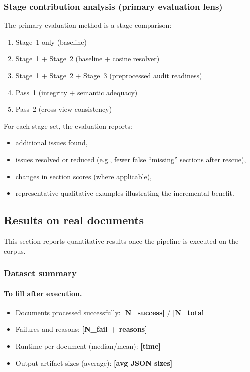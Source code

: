 \subsubsection{Stage contribution analysis (primary evaluation lens)}
\label{sec:eval_stage_contribution}

The primary evaluation method is a stage comparison:
\begin{enumerate}
    \item Stage~1 only (baseline)
    \item Stage~1 + Stage~2 (baseline + cosine resolver)
    \item Stage~1 + Stage~2 + Stage~3 (preprocessed audit readiness)
    \item Pass~1 (integrity + semantic adequacy)
    \item Pass~2 (cross-view consistency)
\end{enumerate}

For each stage set, the evaluation reports:
\begin{itemize}
    \item additional issues found,
    \item issues resolved or reduced (e.g., fewer false ``missing'' sections after rescue),
    \item changes in section scores (where applicable),
    \item representative qualitative examples illustrating the incremental benefit.
\end{itemize}

\subsection{Results on real documents}
\label{sec:eval_results}

This section reports quantitative results once the pipeline is executed on the corpus.

\subsubsection{Dataset summary}
\label{sec:eval_dataset_summary}

\paragraph{To fill after execution.}
\begin{itemize}
    \item Documents processed successfully: \textbf{[N\_success]} / \textbf{[N\_total]}
    \item Failures and reasons: \textbf{[N\_fail + reasons]}
    \item Runtime per document (median/mean): \textbf{[time]}
    \item Output artifact sizes (average): \textbf{[avg JSON sizes]}
\end{itemize}

